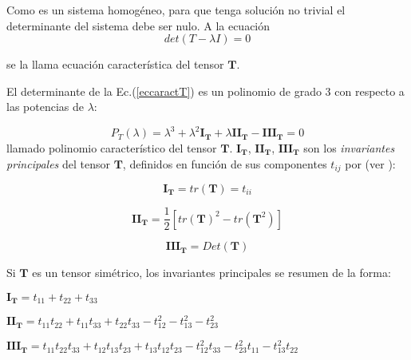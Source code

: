 \bigskip

Como es un sistema homogéneo, para que tenga solución no trivial el determinante del sistema debe ser nulo.
A la ecuación
\begin{equation}
\label{eccaractT}
 det(T- \lambda I)=0   
\end{equation}


\noindent
se la llama ecuación característica  del tensor $\mathbf{T}$. 





El determinante de la Ec.(\ref{eccaractT}) es un polinomio de grado $3$ con respecto  a las potencias de $\lambda$:




 $$ P_T(\lambda) =  \lambda^3 +  \lambda^{2} \mathbf{I_T} + \lambda \mathbf{II_T} - \mathbf{III_T}=0$$
\noindent 
llamado polinomio característico del tensor $\mathbf{T}$. $\mathbf{I_T}$, $\mathbf{II_T}$, $\mathbf{III_T}$ son los \textit{invariantes principales} del tensor $\mathbf{T}$, definidos en función de sus componentes $t_{ij}$ por  (ver \cite{chaves}):

$$\mathbf{I_T}=tr(\mathbf{T})=t_{ii}$$

$$\mathbf{II_T}=\frac{1}{2} [ tr(\mathbf{T})^2-tr(\mathbf{T}^2)]$$


$$\mathbf{III_T}=Det(\mathbf{T})$$


Si $\mathbf{T}$ es un tensor simétrico, los invariantes principales se resumen de la forma:

\bigskip

$\mathbf{I_T}=t_{11}+t_{22}+t_{33}$

$\mathbf{II_T}=t_{11}t_{22} +t_{11}t_{33}+ t_{22}t_{33}- t_{12}^2 -t_{13}^2-t_{23}^2  $


$\mathbf{III_T}=t_{11}t_{22}t_{33}+ t_{12}t_{13}t_{23} +t_{13}t_{12}t_{23}- t_{12}^2 t_{33} -t_{23}^2 t_{11}-t_{13}^2 t_{22} $



